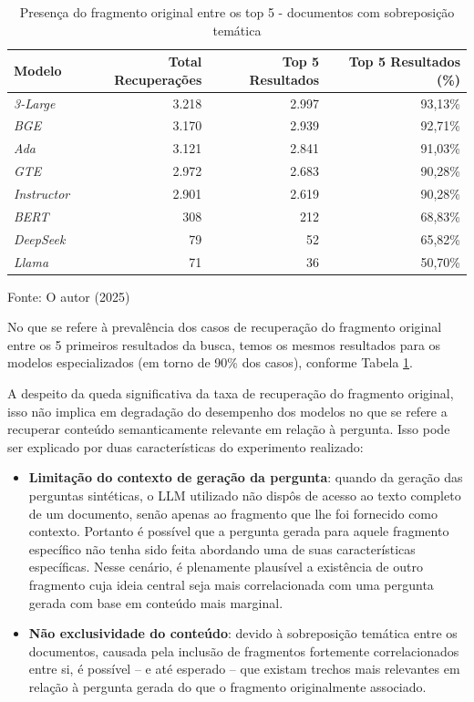 \begin{table}[H]
    \caption{Presença do fragmento original entre os top 5 - documentos com sobreposição temática}
    \centering
    \begin{tabular}{ l r r r }
        \hline
        \textbf{Modelo} & \textbf{Total Recuperações} & \textbf{Top 5 Resultados} & \textbf{Top 5 Resultados (\%)} \\
        \hline
        \textit{3-Large} & 3.218 & 2.997 & 93,13\% \\
        \textit{BGE} & 3.170 & 2.939 & 92,71\% \\
        \textit{Ada} & 3.121 & 2.841 & 91,03\% \\
        \textit{GTE} & 2.972 & 2.683 & 90,28\% \\
        \textit{Instructor} & 2.901 & 2.619 & 90,28\% \\
        \textit{BERT} & 308 & 212 & 68,83\% \\
        \textit{DeepSeek} & 79 & 52 & 65,82\% \\
        \textit{Llama} & 71 & 36 & 50,70\% \\
    \hline
    \end{tabular}
    
    Fonte: O autor (2025)
    \label{tab:recuperacao-5-top-markdown}
\end{table}

No que se refere à prevalência dos casos de recuperação do fragmento original entre os 5 primeiros resultados da busca, temos os mesmos resultados para os modelos especializados (em torno de 90\% dos casos), conforme Tabela \ref{tab:recuperacao-5-top-markdown}.

A despeito da queda significativa da taxa de recuperação do fragmento original, isso não implica em degradação do desempenho dos modelos no que se refere a recuperar conteúdo semanticamente relevante em relação à pergunta. Isso pode ser explicado por duas características do experimento realizado:

\begin{itemize}
    \item \textbf{Limitação do contexto de geração da pergunta}: quando da geração das perguntas sintéticas, o \ac{LLM} utilizado não dispôs de acesso ao texto completo de um documento, senão apenas ao fragmento que lhe foi fornecido como contexto. Portanto é possível que a pergunta gerada para aquele fragmento específico não tenha sido feita abordando uma de suas características específicas. Nesse cenário, é plenamente plausível a existência de outro fragmento cuja ideia central seja mais correlacionada com uma pergunta gerada com base em conteúdo mais marginal.
    \item \textbf{Não exclusividade do conteúdo}: devido à sobreposição temática entre os documentos, causada pela inclusão de fragmentos fortemente correlacionados entre si, é possível -- e até esperado -- que existam trechos mais relevantes em relação à pergunta gerada do que o fragmento originalmente associado.
\end{itemize}

